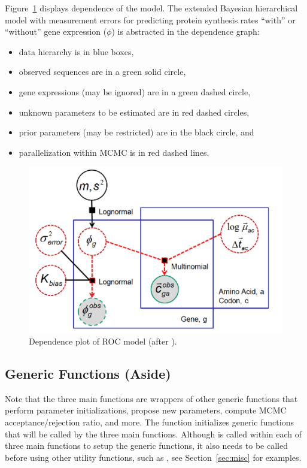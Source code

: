Figure~\ref{fig:bayesian_model} displays dependence of the model.
The extended Bayesian hierarchical model with measurement errors
for predicting protein synthesis rates ``with'' or ``without''
gene expression ($\phi$) is abstracted in the dependence graph:
\begin{itemize}
\item
data hierarchy is in blue boxes,
\item
observed sequences are in a green solid circle, 
\item
gene expressions (may be ignored) are in a green dashed circle,
\item
unknown parameters to be estimated are in red dashed circles,
\item
prior parameters (may be restricted) are in the black circle, and
\item
parallelization within MCMC is in red dashed lines.
\end{itemize}
\begin{figure}[ht]
\centering
\includegraphics[width=5.5in]{cubfits-include/figure/bayesian_model}
\caption{Dependence plot of ROC model (after \citep{Wallace2013}).}
\label{fig:bayesian_model}
\end{figure}



\subsection[Generic Functions (Aside)]{Generic Functions (Aside)}
\label{sec:generic_functions}

Note that the three main functions are wrappers of other generic functions that
perform parameter initializations, propose new parameters, compute
MCMC acceptance/rejection ratio, and more.
The function  initializes generic functions that
will be called by the three main functions.
Although  is called within each of three main
functions to setup the generic functions, it also needs to be called before
using other utility functions, such as , see
Section~\ref{sec:misc} for examples.

